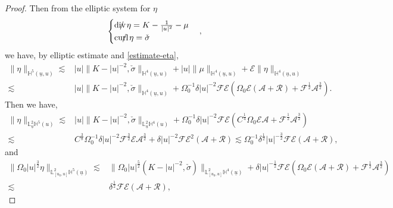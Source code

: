 \documentclass[11pt,reqno]{amsart}
\theoremstyle{definition}
\numberwithin{equation}{section}
\renewcommand{\L}{\mathbb{L}}
\renewcommand{\H}{\mathbb{H}}
\def\ub{\underline{u}}
\def\divs{\mbox{$\mathrm{div} \mkern -13mu /$ }}
\def\curls{\mbox{$\mathrm{curl} \mkern -13mu /$ }}
\begin{document}
\begin{proof}
Then from the elliptic system for $\eta$
\begin{align}\label{equ-ellipticeta}
\begin{cases}\divs\eta=K-\frac{1}{|u|^2}-\mu\\
\curls\eta=\check{\sigma}\end{cases},
\end{align}
we have, by elliptic estimate and \eqref{estimate-eta},
\begin{align*}
\|\eta\|_{\H^5(\ub,u)}\lesssim&|u|\|K-|u|^{-2},\check{\sigma}\|_{\H^4(\ub,u)}+|u|\|\mu\|_{\H^4(\ub,u)}+\mathscr{E}\|\eta\|_{\H^4(\ub,u)}\\
\lesssim&|u|\|K-|u|^{-2},\check{\sigma}\|_{\H^4(\ub,u)}+\Omega_0^{-1}\delta|u|^{-2}\mathscr{F}\mathscr{E}(\Omega_0\mathscr{E}(\mathcal{A}+\mathcal{R})+\mathscr{F}^{\frac{1}{2}}\mathcal{A}^{\frac{3}{2}}).
\end{align*}
Then we have,
\begin{equation}\label{estimate-nablas5etaub}
\begin{split}
\|\eta\|_{\L^2_{\ub}\H^5(u)}\lesssim&|u|\|K-|u|^{-2},\check{\sigma}\|_{\L^2_{\ub}\H^4(u)}+\Omega_0^{-1}\delta|u|^{-2}\mathscr{F}\mathscr{E}(C^{\frac{1}{4}}\Omega_0\mathscr{E}\mathcal{A}+\mathscr{F}^{\frac{1}{2}}\mathcal{A}^{\frac{3}{2}})\\
\lesssim&C^{\frac{3}{8}}\Omega_0^{-1}\delta|u|^{-2}\mathscr{F}^{\frac{3}{2}}\mathscr{E}\mathcal{A}^{\frac{3}{2}}+\delta|u|^{-2}\mathscr{F}\mathscr{E}^2(\mathcal{A}+\mathcal{R})\lesssim \Omega_0^{-1}\delta^{\frac{1}{2}}|u|^{-\frac{3}{2}}\mathscr{F}\mathscr{E}(\mathcal{A}+\mathcal{R}),
\end{split}
\end{equation}
and 
\begin{equation}\label{estimate-nablas5etau}
\begin{split}
\|\Omega_0|u|^{\frac{3}{2}}\eta\|_{\L^2_{[u_0,u]}\H^5(\ub)}\lesssim&\|\Omega_0|u|^{\frac{5}{2}}(K-|u|^{-2},\check{\sigma})\|_{\L^2_{[u_0,u]}\H^4(\ub)}+\delta|u|^{-\frac{1}{2}}\mathscr{F}\mathscr{E}(\Omega_0\mathscr{E}(\mathcal{A}+\mathcal{R})+\mathscr{F}^{\frac{1}{2}}\mathcal{A}^{\frac{3}{2}})\\
\lesssim&\delta^{\frac{1}{2}}\mathscr{F}\mathscr{E}(\mathcal{A}+\mathcal{R}),
\end{split}
\end{equation}


\end{proof}
\end{document}
